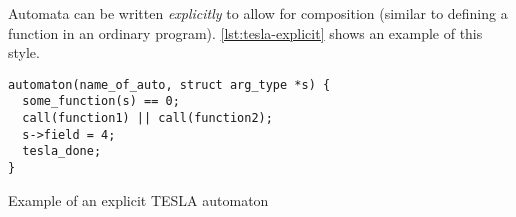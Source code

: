 Automata can be written \emph{explicitly} to allow for composition
(similar to defining a function in an ordinary program).
\autoref{lst:tesla-explicit} shows an example of this style.

\begin{listing}[ht]
  \begin{verbatim}
automaton(name_of_auto, struct arg_type *s) {
  some_function(s) == 0;
  call(function1) || call(function2);
  s->field = 4;
  tesla_done;
}
  \end{verbatim}
  \caption{Example of an explicit TESLA automaton}
  \label{lst:tesla-explicit}
\end{listing}
